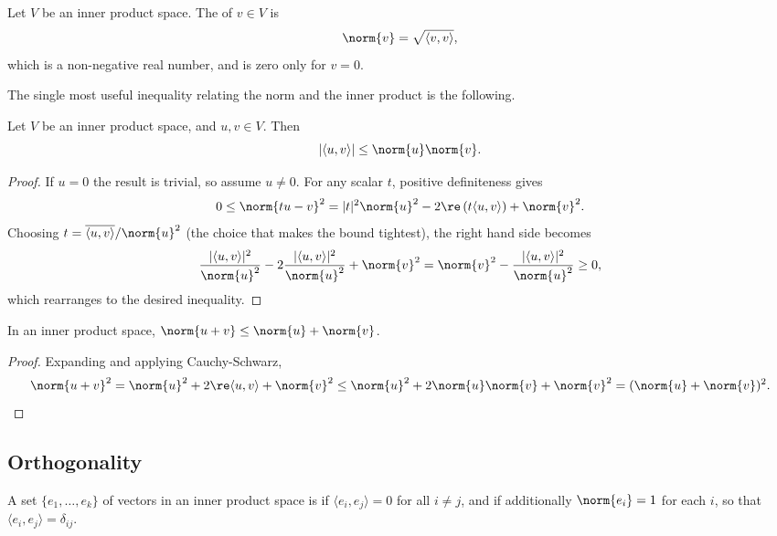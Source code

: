 \begin{definition}[Norm]
    Let $V$ be an inner product space. The  of $v \in V$ is
    $$
    \norm{v} = \sqrt{\langle v, v\rangle},
    $$
    which is a non-negative real number, and is zero only for $v = 0$.
\end{definition}

The single most useful inequality relating the norm and the inner product is the following.

\begin{theorem}
    Let $V$ be an inner product space, and $u, v \in V$. Then
    $$
    |\langle u, v \rangle| \leq \norm{u} \norm{v}.
    $$
\end{theorem}
\begin{proof}
    If $u = 0$ the result is trivial, so assume $u \neq 0$. For any scalar $t$, positive definiteness gives
    $$
    0 \leq \norm{tu - v}^2 = |t|^2 \norm{u}^2 - 2\re\left(t \langle u, v\rangle\right) + \norm{v}^2.
    $$
    Choosing $t = \overline{\langle u, v\rangle}/\norm{u}^2$ (the choice that makes the bound tightest), the right hand side becomes
    $$
    \frac{|\langle u, v\rangle|^2}{\norm{u}^2} - 2\frac{|\langle u, v\rangle|^2}{\norm{u}^2} + \norm{v}^2 = \norm{v}^2 - \frac{|\langle u, v\rangle|^2}{\norm{u}^2} \geq 0,
    $$
    which rearranges to the desired inequality.
\end{proof}

\begin{corollary}
    In an inner product space, $\norm{u + v} \leq \norm{u} + \norm{v}$.
\end{corollary}
\begin{proof}
    Expanding and applying Cauchy-Schwarz,
    $$
    \norm{u + v}^2 = \norm{u}^2 + 2\re \langle u, v\rangle + \norm{v}^2 \leq \norm{u}^2 + 2\norm{u}\norm{v} + \norm{v}^2 = (\norm{u} + \norm{v})^2. \qedhere
    $$
\end{proof}

\subsection{Orthogonality}

\begin{definition}
    A set $\{e_1, \dots, e_k\}$ of vectors in an inner product space is  if $\langle e_i, e_j \rangle = 0$ for all $i \neq j$, and  if additionally $\norm{e_i} = 1$ for each $i$, so that $\langle e_i, e_j \rangle = \delta_{ij}$.
\end{definition}

